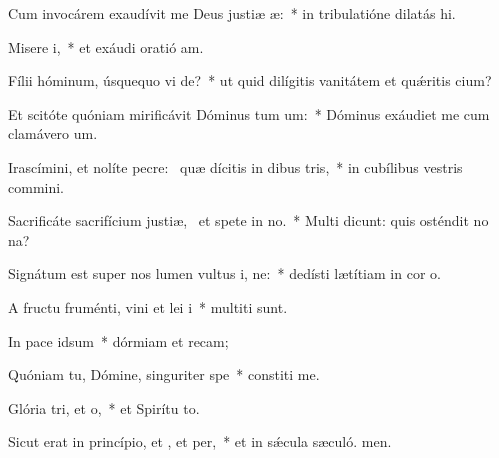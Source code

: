 \item Cum invocárem exaudívit me Deus justiæ æ:~* in tribulatióne dilatás hi.
\item Misere i,~* et exáudi oratió am.
\item Fílii hóminum, úsquequo vi de?~* ut quid dilígitis vanitátem et quǽritis cium?
\item Et scitóte quóniam mirificávit Dóminus tum um:~* Dóminus exáudiet me cum clamávero  um.
\item Irascímini, et nolíte pecre:~\pscross{} quæ dícitis in dibus tris,~* in cubílibus vestris commini.
\item Sacrificáte sacrifícium justiæ,~\pscross{} et spete in no.~* Multi dicunt: quis osténdit no na?
\item Signátum est super nos lumen vultus i, ne:~* dedísti lætítiam in cor o.
\item A fructu fruménti, vini et lei i~* multiti sunt.
\item In pace  idsum~* dórmiam et recam;
\item Quóniam tu, Dómine, singuriter  spe~* constiti me.
\item Glória tri, et o,~* et Spirítu to.
\item Sicut erat in princípio, et , et per,~* et in sǽcula sæculó. men.

